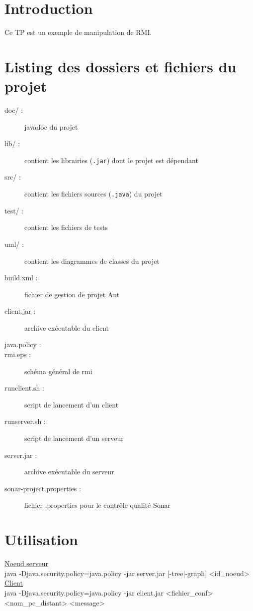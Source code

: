 \section*{Introduction}
Ce TP est un exemple de manipulation de RMI.

\section*{Listing des dossiers et fichiers du projet}
\begin{description}
	\item[doc/ :] javadoc du projet
	\item[lib/ :] contient les librairies (\verb+.jar+) dont le projet est dépendant
	\item[src/ :] contient les fichiers sources (\verb+.java+) du projet
	\item[test/ :] contient les fichiers de tests
	\item[uml/ :] contient les diagrammes de classes du projet
	\item[build.xml :] fichier de gestion de projet Ant
	\item[client.jar :] archive exécutable du client
	\item[java.policy :]
	\item[rmi.eps :] schéma général de rmi
	\item[runclient.sh :] script de lancement d'un client
	\item[runserver.sh :] script de lancement d'un serveur
	\item[server.jar :] archive exécutable du serveur
	\item[sonar-project.properties :] fichier .properties pour le contrôle qualité Sonar
\end{description}

\section*{Utilisation}
	\underline{Noeud serveur}\\
		java -Djava.security.policy=java.policy -jar server.jar [-tree|-graph] <id\_noeud>\\
	\underline{Client}\\
		java -Djava.security.policy=java.policy -jar client.jar <fichier\_conf> <nom\_pc\_distant> <message>
	
			
